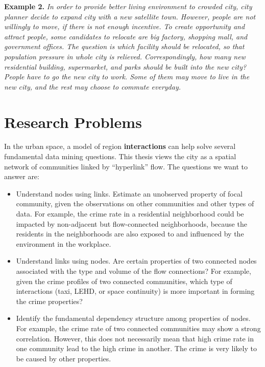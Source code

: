 \textbf{Example 2.} \emph{In order to provide better living environment to crowded city, city planner decide to expand city with a new satellite town. However, people are not willingly to move, if there is not enough incentive. To create opportunity and attract people, some candidates to relocate are big factory, shopping mall, and government offices. The question is which facility should be relocated, so that population pressure in whole  city  is relieved.  Correspondingly, how many new residential building, supermarket, and parks should be built into the new city? People have to go the new city to work. Some of them may move to live in the new city, and the rest may choose to commute everyday.}





\section{Research Problems}
\label{sec:qa}


In the urban space, a model of region \textbf{interactions} can help solve  several fundamental data mining questions. This thesis views  the city as a spatial network of communities linked by ``hyperlink'' flow. The questions we want to answer are:
\begin{itemize}
\item Understand nodes using links. Estimate an unobserved property of focal community, given the observations on other communities and other types of data. For example, the crime rate in a residential neighborhood could be impacted by  non-adjacent but flow-connected neighborhoods, because the residents in the neighborhoods are also exposed to and influenced by the environment in the workplace.
\item Understand links using nodes. Are certain properties of two connected nodes associated with the type and volume of the flow connections? For example, given the crime profiles of two connected communities, which type of interactions (taxi, LEHD, or space continuity) is more important in forming the crime properties?
\item Identify the fundamental dependency structure among properties of nodes. For example, the crime rate of two connected communities may show a strong correlation. However, this does not necessarily mean that high crime rate in one community lead to the high crime in another. The crime is very likely to be caused by other properties. 
\end{itemize}




